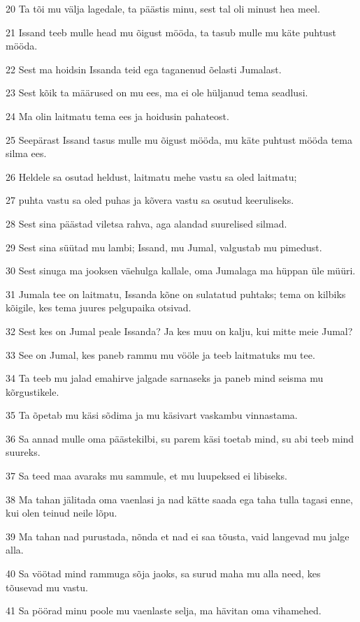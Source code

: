 \par 20 Ta tõi mu välja lagedale, ta päästis minu, sest tal oli minust hea meel.
\par 21 Issand teeb mulle head mu õigust mööda, ta tasub mulle mu käte puhtust mööda.
\par 22 Sest ma hoidsin Issanda teid ega taganenud õelasti Jumalast.
\par 23 Sest kõik ta määrused on mu ees, ma ei ole hüljanud tema seadlusi.
\par 24 Ma olin laitmatu tema ees ja hoidusin pahateost.
\par 25 Seepärast Issand tasus mulle mu õigust mööda, mu käte puhtust mööda tema silma ees.
\par 26 Heldele sa osutad heldust, laitmatu mehe vastu sa oled laitmatu;
\par 27 puhta vastu sa oled puhas ja kõvera vastu sa osutud keeruliseks.
\par 28 Sest sina päästad viletsa rahva, aga alandad suurelised silmad.
\par 29 Sest sina süütad mu lambi; Issand, mu Jumal, valgustab mu pimedust.
\par 30 Sest sinuga ma jooksen väehulga kallale, oma Jumalaga ma hüppan üle müüri.
\par 31 Jumala tee on laitmatu, Issanda kõne on sulatatud puhtaks; tema on kilbiks kõigile, kes tema juures pelgupaika otsivad.
\par 32 Sest kes on Jumal peale Issanda? Ja kes muu on kalju, kui mitte meie Jumal?
\par 33 See on Jumal, kes paneb rammu mu vööle ja teeb laitmatuks mu tee.
\par 34 Ta teeb mu jalad emahirve jalgade sarnaseks ja paneb mind seisma mu kõrgustikele.
\par 35 Ta õpetab mu käsi sõdima ja mu käsivart vaskambu vinnastama.
\par 36 Sa annad mulle oma päästekilbi, su parem käsi toetab mind, su abi teeb mind suureks.
\par 37 Sa teed maa avaraks mu sammule, et mu luupeksed ei libiseks.
\par 38 Ma tahan jälitada oma vaenlasi ja nad kätte saada ega taha tulla tagasi enne, kui olen teinud neile lõpu.
\par 39 Ma tahan nad purustada, nõnda et nad ei saa tõusta, vaid langevad mu jalge alla.
\par 40 Sa vöötad mind rammuga sõja jaoks, sa surud maha mu alla need, kes tõusevad mu vastu.
\par 41 Sa pöörad minu poole mu vaenlaste selja, ma hävitan oma vihamehed.
